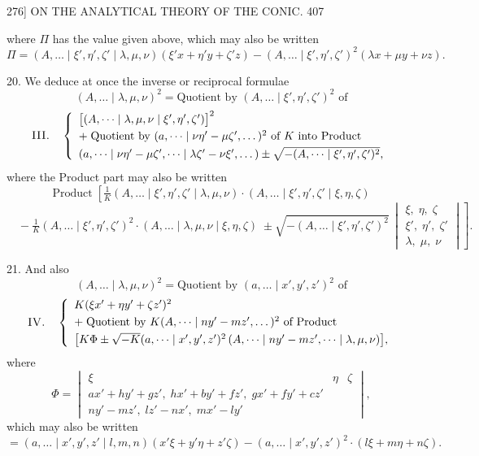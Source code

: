 \documentclass[11pt]{article}
\begin{document}
\begin{center}
\textsc{276]} \hfill ON THE ANALYTICAL THEORY OF THE CONIC. \hfill 407
\end{center}

where $\Pi$ has the value given above, which may also be written
\[ \Pi = (A,\dots \mid \xi',\eta',\zeta' \mid \lambda,\mu,\nu)(\xi' x+\eta' y+\zeta' z)
-(A,\dots \mid \xi',\eta',\zeta')^{2}(\lambda x+\mu y+\nu z). \]

\textsc{20.} We deduce at once the inverse or reciprocal formulae
\[ (A,\dots \mid \lambda,\mu,\nu)^{2}=\text{Quotient by }(A,\dots \mid \xi',\eta',\zeta')^{2}\text{ of} \]
\[ \textsc{III.}\quad\left\{\begin{array}{l}
\bigl[(A,\dots \mid \lambda,\mu,\nu \mid \xi',\eta',\zeta')\bigr]^{2}\\[0.3em]
+\;\text{Quotient by }(a,\dots \mid \nu\eta'-\mu\zeta',\dots)^{2}\text{ of }K\text{ into Product}\\[0.3em]
(a,\dots \mid \nu\eta'-\mu\zeta',\dots \mid \lambda\zeta'-\nu\xi',\dots)\pm\sqrt{-(A,\dots \mid \xi',\eta',\zeta')^{2}},
\end{array}\right. \]
where the Product part may also be written
\[ \text{Product}\;\left[\tfrac{1}{K}(A,\dots \mid \xi',\eta',\zeta' \mid \lambda,\mu,\nu)\cdot(A,\dots \mid \xi',\eta',\zeta' \mid \xi,\eta,\zeta)\right. \]
\[ \left.\quad -\tfrac{1}{K}(A,\dots \mid \xi',\eta',\zeta')^{2}\cdot(A,\dots \mid \lambda,\mu,\nu \mid \xi,\eta,\zeta)
\;\pm\sqrt{-(A,\dots \mid \xi',\eta',\zeta')^{2}}\,\begin{vmatrix}\xi,\;\eta,\;\zeta\\ \xi',\;\eta',\;\zeta'\\ \lambda,\;\mu,\;\nu\end{vmatrix}\right]. \]

\textsc{21.} And also
\[ (A,\dots \mid \lambda,\mu,\nu)^{2}=\text{Quotient by }(a,\dots \mid x',y',z')^{2}\text{ of} \]
\[ \textsc{IV.}\quad\left\{\begin{array}{l}
K(\xi x'+\eta y'+\zeta z')^{2}\\[0.3em]
+\;\text{Quotient by }K(A,\dots \mid ny'-mz',\dots)^{2}\text{ of Product}\\[0.3em]
\bigl[K\Phi\pm\sqrt{-K}(a,\dots \mid x',y',z')^{2}\,(A,\dots \mid ny'-mz',\dots \mid \lambda,\mu,\nu)\bigr],
\end{array}\right. \]
where
\[ \Phi=\begin{vmatrix}
\xi & \eta & \zeta\\
ax'+hy'+gz',\;hx'+by'+fz',\;gx'+fy'+cz'\\
ny'-mz',\;lz'-nx',\;mx'-ly'
\end{vmatrix}, \]
which may also be written
\[ =(a,\dots \mid x',y',z' \mid l,m,n)(x'\xi+y'\eta+z'\zeta) -(a,\dots \mid x',y',z')^{2}\cdot(l\xi+m\eta+n\zeta). \]
\end{document}
